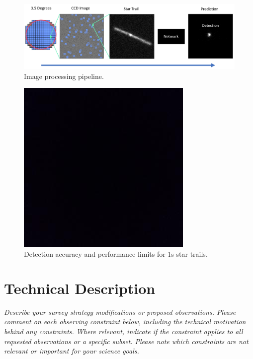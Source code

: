 \documentclass[12pt, letterpaper]{article}
\begin{document}
\begin{figure}[htb!]
\center
\includegraphics[width=\columnwidth]{imageprocessing.png}
\caption{Image processing pipeline.}
\label{fig:pipeline}
\end{figure}

\begin{figure}[htb!]
\center
\includegraphics{bbox.jpeg}
\caption{Detection accuracy and performance limits for 1s star trails.}
\label{fig:shortlimit}
\end{figure}

\vspace{.6in}
\newpage
\section{Technical Description}
\label{sec:technical}
\begin{footnotesize}
{\it Describe your survey strategy modifications or proposed observations. Please comment on each observing constraint
below, including the technical motivation behind any constraints. Where relevant, indicate
if the constraint applies to all requested observations or a specific subset. Please note which 
constraints are not relevant or important for your science goals.}
\end{footnotesize}
\end{document}
